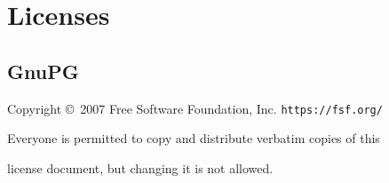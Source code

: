 \documentclass{article}
\begin{document}
  \section{Licenses}
  \subsection{GnuPG}
  \begin{center}
    {\parindent 0in
    
    Copyright \copyright\  2007 Free Software Foundation, Inc. \texttt{https://fsf.org/}
    
    \bigskip
    Everyone is permitted to copy and distribute verbatim copies of this
    
    license document, but changing it is not allowed.}
    
    \end{center}
    
\end{document}
